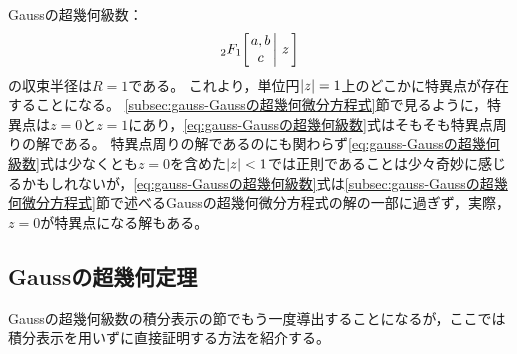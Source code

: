 \documentclass[a4paper,draft]{ltjsarticle}
\begin{document}
Gaussの超幾何級数：
\begin{equation}
    \Gauss{a}{b}{c}{z}\label{eq:gauss-Gaussの超幾何級数}
\end{equation}
の収束半径は$R=1$である。
これより，単位円$\abs{z}=1$上のどこかに特異点が存在することになる。
\ref{subsec:gauss-Gaussの超幾何微分方程式}節で見るように，特異点は$z=0$と$z=1$にあり，\eqref{eq:gauss-Gaussの超幾何級数}式はそもそも特異点周りの解である。
特異点周りの解であるのにも関わらず\eqref{eq:gauss-Gaussの超幾何級数}式は少なくとも$z=0$を含めた$\abs{z}<1$では正則であることは少々奇妙に感じるかもしれないが，\eqref{eq:gauss-Gaussの超幾何級数}式は\ref{subsec:gauss-Gaussの超幾何微分方程式}節で述べるGaussの超幾何微分方程式の解の一部に過ぎず，実際，$z=0$が特異点になる解もある。

\subsection{Gaussの超幾何定理}\label{subsec:gauss-Gaussの超幾何定理}
Gaussの超幾何級数の積分表示の節でもう一度導出することになるが，ここでは積分表示を用いずに直接証明する方法を紹介する。
\end{document}
